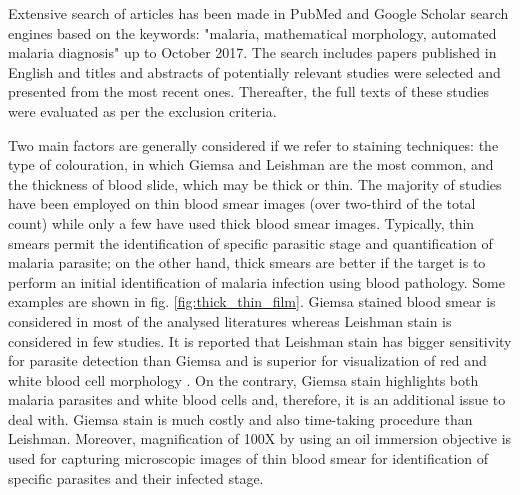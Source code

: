 \documentclass[sensors,review,submit,moreauthors,pdftex,10pt,a4paper]{mdpi}
\begin{document}
Extensive search of articles has been made in PubMed and Google Scholar search engines based on the keywords: "malaria, mathematical morphology, automated malaria diagnosis" up to October  2017. The search includes papers published in English and titles and abstracts of potentially relevant studies were selected and presented from the most recent ones. Thereafter, the full texts of these studies were evaluated as per the exclusion criteria.

Two main factors are generally considered if we refer to staining techniques: the type of colouration, in which Giemsa and Leishman are the most common, and the thickness of blood slide, which may be thick or thin.
The majority of studies have been employed on thin blood smear images (over two-third of the total count) while only a few have used thick blood smear images.
Typically, thin smears permit the identification of specific parasitic stage and quantification of malaria parasite; on the other hand, thick smears are better if the target is to perform an initial identification of malaria infection using blood pathology. Some examples are shown in fig. \ref{fig:thick_thin_film}.
Giemsa stained blood smear is considered in most of the analysed literatures whereas Leishman stain is considered in few studies. %
It is reported that Leishman stain has bigger sensitivity for parasite detection than Giemsa \cite{Khan2014} and is superior for visualization of red and white blood cell morphology \cite{Sathpathi2014}. On the contrary, Giemsa stain highlights both malaria parasites and white blood cells and, therefore, it is an additional issue to deal with.
Giemsa stain is much costly and also time-taking procedure than Leishman.
Moreover, magnification of 100X by using an oil immersion objective is used for capturing microscopic images of thin blood smear for identification of specific parasites and their infected stage.
\end{document}

